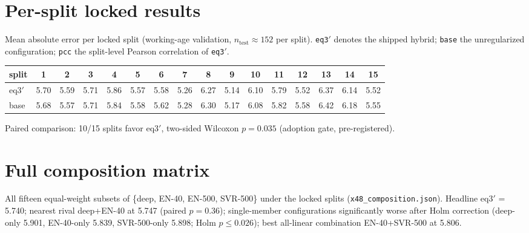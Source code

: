 \documentclass[11pt]{article}
\begin{document}
\section{Per-split locked results}
Mean absolute error per locked split (working-age validation, $n_{\text{test}}\approx152$
per split). \texttt{eq3}$'$ denotes the shipped hybrid; \texttt{base} the
unregularized configuration; \texttt{pcc} the split-level Pearson correlation of
\texttt{eq3}$'$.
\begin{table}[h]
\centering\small
\begin{tabular}{lccccccccccccccc}
\toprule
split & 1 & 2 & 3 & 4 & 5 & 6 & 7 & 8 & 9 & 10 & 11 & 12 & 13 & 14 & 15 \\
\midrule
eq3$'$ & 5.70 & 5.59 & 5.71 & 5.86 & 5.57 & 5.58 & 5.26 & 6.27 & 5.14 & 6.10 & 5.79 & 5.52 & 6.37 & 6.14 & 5.52 \\
base & 5.68 & 5.57 & 5.71 & 5.84 & 5.58 & 5.62 & 5.28 & 6.30 & 5.17 & 6.08 & 5.82 & 5.58 & 6.42 & 6.18 & 5.55 \\
\bottomrule
\end{tabular}
\end{table}
Paired comparison: 10/15 splits favor eq3$'$, two-sided Wilcoxon $p=0.035$
(adoption gate, pre-registered).

\section{Full composition matrix}
All fifteen equal-weight subsets of \{deep, EN-40, EN-500, SVR-500\} under the
locked splits (\texttt{x48\_composition.json}). Headline eq3$'$ = 5.740; nearest
rival deep+EN-40 at 5.747 (paired $p=0.36$); single-member configurations
significantly worse after Holm correction (deep-only 5.901, EN-40-only 5.839,
SVR-500-only 5.898; Holm $p\le 0.026$); best all-linear combination
EN-40+SVR-500 at 5.806.
\end{document}
